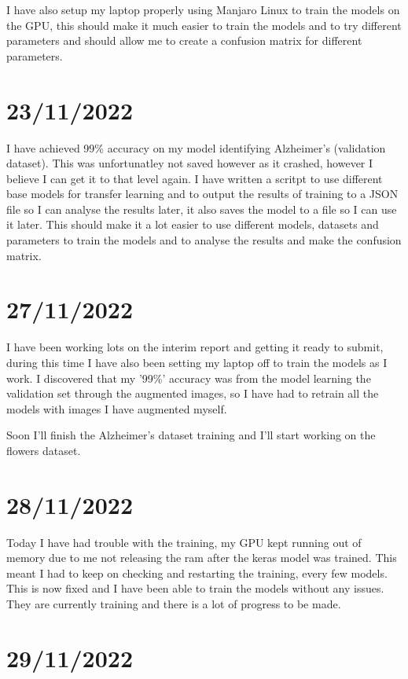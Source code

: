 \documentclass[]{final_report}
\begin{document}
I have also setup my laptop properly using Manjaro Linux to train the models on the GPU, this should make it much easier to train the models and to try different parameters and should allow me to create a confusion matrix for different parameters.

\section*{23/11/2022}

I have achieved 99\% accuracy on my model identifying Alzheimer's (validation dataset). This was unfortunatley not saved however as it crashed, however I believe I can get it to that level again.
I have written a scritpt to use different base models for transfer learning and to output the results of training to a JSON file so I can analyse the results later, it also saves the model to a file so I can use it later.
This should make it a lot easier to use different models, datasets and parameters to train the models and to analyse the results and make the confusion matrix.

\section*{27/11/2022}
I have been working lots on the interim report and getting it ready to submit, during this time I have also been setting my laptop off to train the models
as I work. I discovered that my '99\%' accuracy was from the model learning the validation set through the augmented images, so I have had to retrain all the 
models with images I have augmented myself.

Soon I'll finish the Alzheimer's dataset training and I'll start working on the flowers dataset.

\section*{28/11/2022}

Today I have had trouble with the training, my GPU kept running out of memory due to me not releasing the ram after the keras model was trained. This meant I had to keep on checking and restarting the training, every few models. This is now fixed and I have been able to train the models without any issues. They are currently training and there is a lot of progress to be made.

\section*{29/11/2022}
\end{document}
